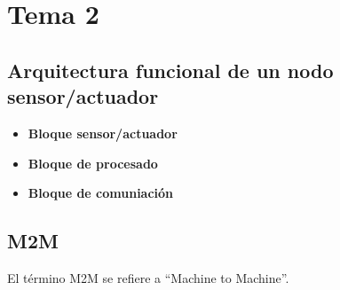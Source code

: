 \documentclass[12pt, letterpaper]{article}
\title{\doctitle}
\author{Juan Luis Serradilla Tormos}
\date{\monthname[\month] de \the\year}
\begin{document}
\pagestyle{fancy}

\maketitle

\newpage
\tableofcontents

\newpage

\section{Tema 2}

\subsection{Arquitectura funcional de un nodo sensor/actuador}

\begin{itemize}
    \item \textbf{Bloque sensor/actuador}
    \item \textbf{Bloque de procesado}
    \item \textbf{Bloque de comuniación}
\end{itemize}

\subsection{M2M}
El término M2M se refiere a ``Machine to Machine''.
\end{document}
